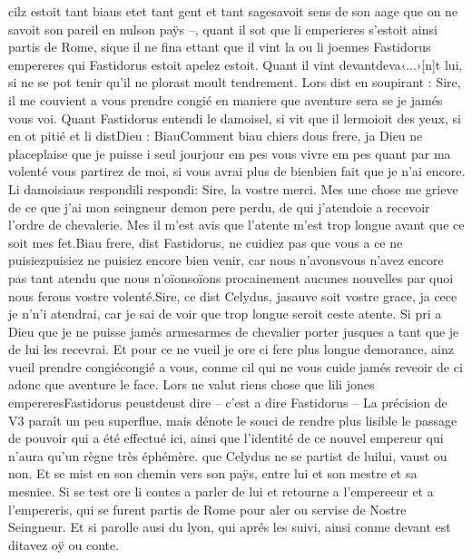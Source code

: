 \documentclass{article}
\begin{document}
\begin{pages}
   cilz estoit tant biaus etet tant gent et tant 
   sagesavoit sens de son aage que on ne savoit son pareil en 
   nulson paÿs –, quant il sot que 
   li emperieres s’estoit ainsi partis de Rome,
   sique il ne fina 
   ettant que il vint la ou li joennes 
   Fastidorus
      empereres qui Fastidorus estoit apelez estoit.
   Quant il vint devantdeva‹...›[n]t lui, si ne se pot tenir qu’il ne plorast moult 
   tendrement. Lors dist en soupirant :
   Sire, il me couvient a vous prendre congié en maniere que aventure sera se je jamés vous voi. \pend
\pstart Quant Fastidorus entendi 
   le damoisel, si vit que il lermoioit des yeux, 
   si en ot pitié et li distDieu :
   BiauComment biau chiers dous frere, 
      ja Dieu ne placeplaise que 
      je puisse i seul 
      jourjour em pes vous vivre em pes 
      quant par ma volenté vous partirez de moi, si vous avrai plus de bienbien fait 
      que je n’ai encore.
   Li damoisiaus respondili respondi:
   Sire, la vostre merci. Mes une chose me grieve de ce que j’ai 
      mon seingneur demon pere perdu, 
      de qui j’atendoie a recevoir l’ordre de chevalerie.  Mes il m’est avis que l’atente m’est trop longue avant que ce soit mes fet.Biau frere, dist Fastidorus, ne cuidiez pas que vous 
      a ce ne puisiezpuisiez ne puisiez encore bien venir, car 
      nous n’avonsvous n'avez 
      encore pas tant atendu que nous n’oïonsoïons procainement aucunes nouvelles 
      par quoi nous ferons vostre volenté.Sire, ce dist 
      Celydus, jasauve soit vostre grace, ja 
      cece je n’n'i
      atendrai, car je sai de voir que trop longue seroit ceste atente. Si pri a Dieu que je ne puisse jamés 
      armesarmes de chevalier porter jusques a tant que je de lui les recevrai.
      Et pour ce ne vueil je ore ci 
      fere plus longue demorance, ainz 
      vueil prendre 
      congiécongié a vous,
      conme cil qui ne vous cuide jamés reveoir de ci adonc que aventure le face. \pend
\pstart Lors ne valut riens chose que 
   lili jones 
      empereresFastidorus 
   peustdeust dire 
   – c’est a dire Fastidorus –
   La précision de V3 paraît un peu superflue, mais dénote le souci de rendre plus lisible le passage 
   de pouvoir qui a été effectué ici, ainsi que l'identité de ce nouvel empereur qui n'aura qu'un règne très éphémère.
   que Celydus ne se partist de luilui, vaust 
   ou non. Et se mist en son chemin vers son paÿs, entre lui et son mestre et sa mesniee. 
   Si se test ore li contes a parler de lui et retourne a l’empereeur et 
   a l’empereris, qui se furent partis de Rome 
   pour aler ou servise de Nostre Seingneur. 
      Et si parolle ausi du 
      lyon, qui aprés 
      les suivi,
   ainsi conme devant est ditavez oÿ 
      ou conte. \pend
         

\end{pages}
\end{document}
